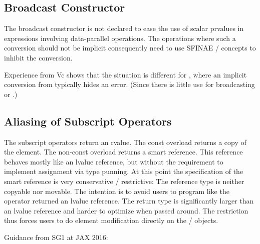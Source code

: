 \subsection{Broadcast Constructor}
The \datapar broadcast constructor is not declared  to ease the use of scalar prvalues in expressions involving data-parallel operations.
The operations where such a conversion should not be implicit consequently need to use SFINAE / concepts to inhibit the conversion.

Experience from Vc shows that the situation is different for \mask, where an implicit conversion from \bool typically hides an error.
(Since there is little use for broadcasting \true or \false.)

\subsection{Aliasing of Subscript Operators}
The subscript operators return an rvalue.
The const overload returns a copy of the element.
The non-const overload returns a smart reference.
This reference behaves mostly like an lvalue reference, but without the requirement to implement assignment via type punning.
At this point the specification of the smart reference is very conservative / restrictive:
The reference type is neither copyable nor movable.
The intention is to avoid users to program like the operator returned an lvalue reference.
The return type is significantly larger than an lvalue reference and harder to optimize when passed around.
The restriction thus forces users to do element modification directly on the \datapar / \mask objects.

Guidance from SG1 at JAX 2016:\\


